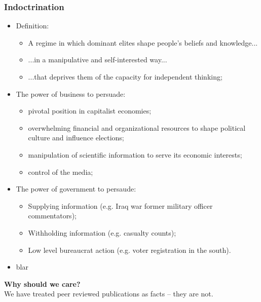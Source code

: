 \documentclass[aspectratio=169]{beamer}
\theoremstyle{principle}
\begin{document}
\begin{frame}
\frametitle{Indoctrination}

\begin{itemize}
\item Definition:
\begin{itemize}
\item A regime in which dominant elites shape people's beliefs and knowledge...
\item ...in a manipulative and self-interested way...
\item ...that deprives them of the capacity for independent thinking;
\end{itemize}
\bigskip
\bigskip
\item The power of business to persuade:
\begin{itemize}
\item pivotal position in capitalist economies;
\item overwhelming financial and organizational resources to shape political culture and influence elections;
\item manipulation of scientific information to serve its economic interests;
\item control of the media;
\end{itemize}
\bigskip
\bigskip
\item The power of government to persaude:
\begin{itemize}
\item Supplying information (e.g. Iraq war former military officer commentators);
\item Withholding information (e.g. casualty counts);
\item Low level bureaucrat action (e.g. voter registration in the south).
\end{itemize}
\bigskip
\bigskip
\item blar
\end{itemize}

\end{frame}

\begin{frame}

\begin{center}
\Huge\textbf{Why should we care?}\\
\bigskip
\bigskip
\large We have treated peer reviewed publications as facts -- they are not.
\\
\end{center}

\end{frame}
\end{document}
